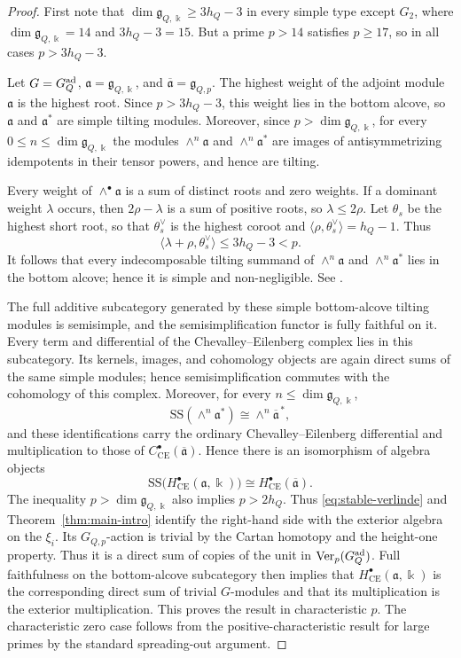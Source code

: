 \documentclass[12pt]{amsart}
\theoremstyle{remark}
\DeclareMathOperator{\Ver}{Ver}
\newcommand{\kk}{\Bbbk}
\newcommand{\g}{\mathfrak g}
\newcommand{\CE}{\mathrm{CE}}
\begin{document}
\begin{proof} First note that $\dim\g_{Q,\kk}\geq3h_Q-3$ in every simple type except $G_2$, where
$\dim\g_{Q,\kk}=14$ and $3h_Q-3=15$.  But a prime $p>14$ satisfies $p\geq17$, so in all cases 
$p>3h_Q-3$. 

Let $G=G_Q^{\rm ad}$, $\mathfrak a=\g_{Q,\kk}$, and
$\overline{\mathfrak a}=\g_{Q,p}$.  The highest weight of the adjoint
module $\mathfrak a$ is the highest root. Since $p>3h_Q-3$, this weight lies
in the bottom alcove, so $\mathfrak a$ and $\mathfrak a^*$ are simple tilting
modules.  Moreover, since $p>\dim\g_{Q,\kk}$, for every $0\leq n\leq \dim\g_{Q,\kk}$ the modules
$\wedge^n\mathfrak a$ and $\wedge^n\mathfrak a^*$ are images of
antisymmetrizing idempotents in their tensor powers, and hence are tilting.

Every weight of $\wedge^\bullet\mathfrak a$ is a sum of distinct roots and
zero weights.  If a dominant weight $\lambda$ occurs, then
$2\rho-\lambda$ is a sum of positive roots, so $\lambda\leq2\rho$.  Let
$\theta_s$ be the highest short root, so that $\theta_s^\vee$ is the highest
coroot and
$\langle\rho,\theta_s^\vee\rangle=h_Q-1$.  Thus
\[
 \langle\lambda+\rho,\theta_s^\vee\rangle
 \leq3h_Q-3<p.
\]
It follows that every indecomposable tilting summand of
$\wedge^n\mathfrak a$ and $\wedge^n\mathfrak a^*$ lies in the bottom alcove;
hence it is simple and non-negligible.  See
\cite[Chapter~II, Sections~5--6]{Jan03}.

The full additive subcategory generated by these simple bottom-alcove tilting
modules is semisimple, and the semisimplification functor is fully faithful
on it.  Every term and differential of the Chevalley--Eilenberg complex lies
in this subcategory.  Its kernels, images, and cohomology objects are again
direct sums of the same simple modules; hence semisimplification commutes
with the cohomology of this complex.  Moreover, for every $n\leq \dim\g_{Q,\kk}$,
\[
 \mathrm{SS}(\wedge^n\mathfrak a^*)
 \cong\wedge^n\overline{\mathfrak a}^{\,*},
\]
and these identifications carry the ordinary Chevalley--Eilenberg
differential and multiplication to those of
$C^\bullet_{\CE}(\overline{\mathfrak a})$.  Hence there is an isomorphism
of algebra objects
\[
 \mathrm{SS}\bigl(H^\bullet_{\CE}(\mathfrak a,\kk)\bigr)
 \cong H^\bullet_{\CE}(\overline{\mathfrak a}).
\]
The inequality $p>\dim\g_{Q,\kk}$ also implies $p>2h_Q$.  Thus \eqref{eq:stable-verlinde} and
Theorem~\ref{thm:main-intro} identify the right-hand side with the exterior
algebra on the $\xi_i$.  Its $G_{Q,p}$-action is trivial by the Cartan homotopy
and the height-one property.  Thus it is a direct sum of copies of the unit in
$\Ver_p(G_Q^{\rm ad})$.  Full faithfulness on the bottom-alcove subcategory
then implies that $H^\bullet_{\CE}(\mathfrak a,\kk)$ is the corresponding
direct sum of trivial $G$-modules and that its multiplication is the exterior
multiplication.  This proves the result in characteristic $p$.
The characteristic zero case follows from the positive-characteristic result
for large primes by the standard spreading-out argument. 
\end{proof}
\end{document}
